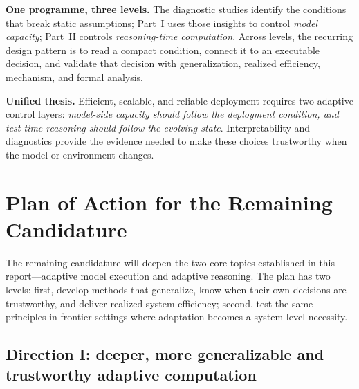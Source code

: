 \documentclass[12pt,a4paper]{article}
\begin{document}
\begin{evidencebox}
\textbf{One programme, three levels.} The diagnostic studies identify the conditions that break static assumptions; Part~I uses those insights to control \emph{model capacity}; Part~II controls \emph{reasoning-time computation}. Across levels, the recurring design pattern is to read a compact condition, connect it to an executable decision, and validate that decision with generalization, realized efficiency, mechanism, and formal analysis.
\end{evidencebox}

\begin{thesisbox}
\textbf{Unified thesis.} Efficient, scalable, and reliable deployment requires two adaptive control layers: \emph{model-side capacity should follow the deployment condition, and test-time reasoning should follow the evolving state}. Interpretability and diagnostics provide the evidence needed to make these choices trustworthy when the model or environment changes.
\end{thesisbox}

\clearpage
\section{Plan of Action for the Remaining Candidature}
\label{sec:future}

The remaining candidature will deepen the two core topics established in this report---adaptive model execution and adaptive reasoning. The plan has two levels: first, develop methods that generalize, know when their own decisions are trustworthy, and deliver realized system efficiency; second, test the same principles in frontier settings where adaptation becomes a system-level necessity.

\subsection{Direction I: deeper, more generalizable and trustworthy adaptive computation}
\end{document}
